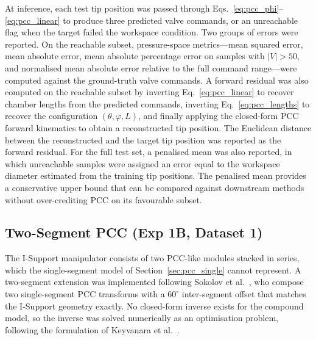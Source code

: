 At inference, each test tip position was passed through Eqs.~\eqref{eq:pcc_phi}--\eqref{eq:pcc_linear} to produce three predicted valve commands, or an unreachable flag when the target failed the workspace condition. Two groups of errors were reported. On the reachable subset, pressure-space metrics---mean squared error, mean absolute error, mean absolute percentage error on samples with $|V| > 50$, and normalised mean absolute error relative to the full command range---were computed against the ground-truth valve commands. A forward residual was also computed on the reachable subset by inverting Eq.~\eqref{eq:pcc_linear} to recover chamber lengths from the predicted commands, inverting Eq.~\eqref{eq:pcc_lengths} to recover the configuration $(\theta, \varphi, L)$, and finally applying the closed-form PCC forward kinematics to obtain a reconstructed tip position. The Euclidean distance between the reconstructed and the target tip position was reported as the forward residual. For the full test set, a penalised mean was also reported, in which unreachable samples were assigned an error equal to the workspace diameter estimated from the training tip positions. The penalised mean provides a conservative upper bound that can be compared against downstream methods without over-crediting PCC on its favourable subset.

\subsection{Two-Segment PCC (Exp 1B, Dataset 1)}
\label{sec:pcc_multi}

The I-Support manipulator consists of two PCC-like modules stacked in series, which the single-segment model of Section~\ref{sec:pcc_single} cannot represent. A two-segment extension was implemented following Sokolov et al.\ \cite{sokolov2024twoseg}, who compose two single-segment PCC transforms with a $60^{\circ}$ inter-segment offset that matches the I-Support geometry exactly. No closed-form inverse exists for the compound model, so the inverse was solved numerically as an optimisation problem, following the formulation of Keyvanara et al.\ \cite{keyvanara2023geometric}.

